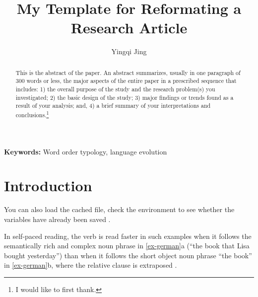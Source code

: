 \documentclass[
]{article}
\title{\normalfont\normalsize My Template for Reformating a Research Article}
\author[1]{\normalsize Yingqi Jing}
\affil[1]{Uppsala University; \href{mailto:yingqi.jing@lingfil.uu.se}{\nolinkurl{yingqi.jing@lingfil.uu.se}}}
\date{}
\providecommand{\keywords}[1]
{\normalsize	
  \textbf{Keywords:} #1
}
\begin{document}
\maketitle

\clearpage
\renewcommand{\abstractname}{\normalsize Abstract}
\begin{abstract}
\renewcommand*{\thefootnote}{\fnsymbol{footnote}}%
\normalsize This is the abstract of the paper. An abstract summarizes, usually in
one paragraph of 300 words or less, the major aspects of the entire
paper in a prescribed sequence that includes: 1) the overall purpose of
the study and the research problem(s) you investigated; 2) the basic
design of the study; 3) major findings or trends found as a result of
your analysis; and, 4) a brief summary of your interpretations and
conclusions.\footnote{I would like to first thank.}
\setcounter{footnote}{0}
\end{abstract}

\vspace{\baselineskip}
\setlength\parindent{24pt}
\keywords{Word order typology, language evolution}


%


\clearpage

\hypertarget{introduction}{%
\section{Introduction}\label{introduction}}

You can also load the cached file, \textcite{Greenberg1963} check the
environment to see whether the variables have already been saved
\autocite{Dryer1992}.

In self-paced reading, the verb is read faster in such examples when it
follows the semantically rich and complex noun phrase in
\ref{ex-german}a (``the book that Lisa bought yesterday'') than when it
follows the short object noun phrase ``the book'' in \ref{ex-german}b,
where the relative clause is extraposed \autocite{Konieczny2000}.
\end{document}
